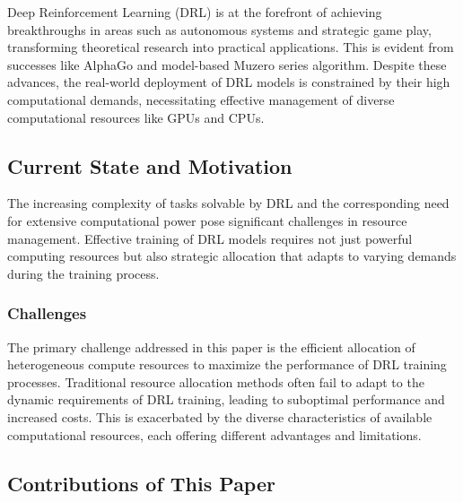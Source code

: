 \documentclass[10pt,journal,compsoc]{IEEEtran}
\begin{document}
\IEEEpeerreviewmaketitle



	Deep Reinforcement Learning (DRL) is at the forefront of achieving breakthroughs in areas such as autonomous systems and strategic game play, transforming theoretical research into practical applications.  This is evident from successes like AlphaGo and model-based Muzero series algorithm. Despite these advances, the real-world deployment of DRL models is constrained by their high computational demands, necessitating effective management of diverse computational resources like GPUs and CPUs.

	\subsection{Current State and Motivation}

	The increasing complexity of tasks solvable by DRL and the corresponding need for extensive computational power pose significant challenges in resource management. Effective training of DRL models requires not just powerful computing resources but also strategic allocation that adapts to varying demands during the training process.

	\subsubsection{Challenges}

	The primary challenge addressed in this paper is the efficient allocation of heterogeneous compute resources to maximize the performance of DRL training processes. Traditional resource allocation methods often fail to adapt to the dynamic requirements of DRL training, leading to suboptimal performance and increased costs. This is exacerbated by the diverse characteristics of available computational resources, each offering different advantages and limitations.

	\subsection{Contributions of This Paper}
\end{document}
